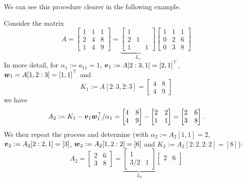 We can see this procedure clearer in the following example.

\begin{example}[LU by-hand] Consider the matrix
\[
A = \begin{bmatrix} 1 & 1 & 1 \\
                    2 & 4 & 8 \\
                    1 & 4 & 9
                    \end{bmatrix} = \underbrace{\begin{bmatrix} 1  \\
                    2 & 1 &  \\
                    1 &  & 1
                    \end{bmatrix}}_{L_1} \begin{bmatrix} 1 & 1 & 1 \\
                    0 & 2 & 6 \\
                    0 & 3 & 8
                    \end{bmatrix}
\]
In more detail, for $\ensuremath{\alpha}_1 := a_{11} = 1$, $\ensuremath{\bm{\v}}_1 := A[2:3,1] = \vectt[2,1]$, $\ensuremath{\bm{\w}}_1 = A[1,2:3] = \vectt[1,1]$ and
\[
K_1 := A[2:3,2:3] = \begin{bmatrix} 4 & 8 \\ 4 & 9 \end{bmatrix}
\]
we have
\[
A_2 := K_1 -\bm{{\mbox{\boldmath$v$\unboldmath}}}_1\bm{{\mbox{\boldmath$w$\unboldmath}}}_1^\top /\alpha_1 = \begin{bmatrix} 4 & 8 \\ 4 & 9 \end{bmatrix} - \begin{bmatrix} 2 & 2 \\ 1 & 1 \end{bmatrix} = \begin{bmatrix} 2 & 6 \\ 3 & 8 \end{bmatrix}.
\]
We then repeat the process and determine (with $\ensuremath{\alpha}_2 := A_2[1,1] = 2$, $\bm{{\mbox{\boldmath$v$\unboldmath}}}_2 := A_2[2:2,1] = [3]$, $\bm{{\mbox{\boldmath$w$\unboldmath}}}_2 := A_2[1,2:2] = [6]$ and $K_2 := A_2[2:2,2:2] = [8]$):
\[
A_2 =  \begin{bmatrix}2 & 6 \\ 3 & 8 \end{bmatrix} =
\underbrace{\begin{bmatrix}
1 \\
3/2 & 1
\end{bmatrix}}_{L_2} \begin{bmatrix} 2 & 6 \\

\end{bmatrix}\]
\end{example}
